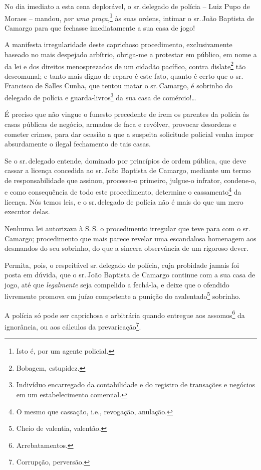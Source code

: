 No dia imediato a esta cena deplorável, o sr.\,delegado de polícia --
Luiz Pupo de Moraes -- mandou, \emph{por uma praça},\footnote{ Isto é,
  por um agente policial.} às suas ordens, intimar o sr.\,João Baptista
de Camargo para que fechasse imediatamente a sua casa de jogo!

A manifesta irregularidade deste caprichoso procedimento, exclusivamente
baseado no mais despejado arbítrio, obriga-me a protestar em público, em
nome a da lei e dos direitos menosprezados de um cidadão pacífico,
contra dislate\footnote{ Bobagem, estupidez.} tão descomunal; e tanto
mais digno de reparo é este fato, quanto é certo que o sr.\,Francisco de
Salles Cunha, que tentou matar o sr.\,Camargo, é sobrinho do delegado de
polícia e guarda-livros\footnote{ Indivíduo encarregado da
  contabilidade e do registro de transações e negócios em um
  estabelecimento comercial.} da sua casa de comércio!\ldots{}

É preciso que não vingue o funesto precedente de irem os parentes da
polícia às casas públicas de negócio, armados de faca e revólver,
provocar desordens e cometer crimes, para dar ocasião a que a suspeita
solicitude policial venha impor absurdamente o ilegal fechamento de tais
casas.

Se o sr.\,delegado entende, dominado por princípios de ordem pública, que
deve cassar a licença concedida ao sr.\,João Baptista de Camargo,
mediante um termo de responsabilidade que assinou, processe-o primeiro,
julgue-o infrator, condene-o, e como consequência de todo este
procedimento, determine o cassamento\footnote{ O mesmo que cassação,
  i.e., revogação, anulação.} da licença. Nós temos leis, e o sr.\,delegado de polícia não é mais do que um mero executor delas.

Nenhuma lei autorizava à S.\,S. o procedimento irregular que teve para
com o sr.\,Camargo; procedimento que mais parece revelar uma escandalosa
homenagem aos desmandos do seu sobrinho, do que a sincera observância de
um rigoroso dever.

Permita, pois, o respeitável sr.\,delegado de polícia, cuja probidade
jamais foi posta em dúvida, que o sr.\,João Baptista de Camargo continue
com a sua casa de jogo, até que \emph{legalmente} seja compelido a
fechá-la, e deixe que o ofendido livremente promova em juízo competente
a punição do avalentado\footnote{ Cheio de valentia, valentão.}
sobrinho.

A polícia só pode ser caprichosa e arbitrária quando entregue aos
assomos\footnote{ Arrebatamentos.} da ignorância, ou aos cálculos da
prevaricação\footnote{ Corrupção, perversão.}.

